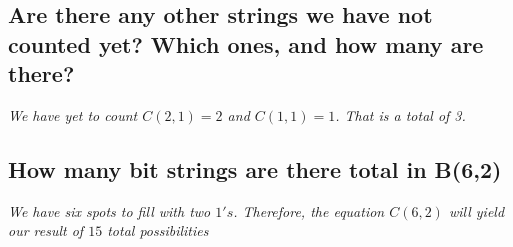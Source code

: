 \documentclass{article}
\begin{document}
\subsection{Are there any other strings we have not counted yet? Which ones, and how many are there?}
\hspace{1cm}\textit{We have yet to count $C(2,1)=2$ and $C(1,1)=1$. That is a total of 3.}
\subsection{How many bit strings are there total in B(6,2)}
\hspace{1cm}\textit{We have six spots to fill with two $1's$. Therefore, the equation
    $C(6,2)$ will yield our result of $15$ total possibilities}
\end{document}
